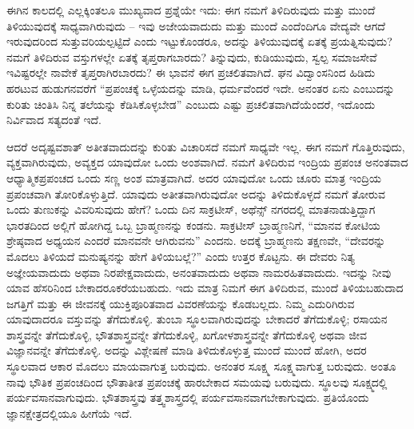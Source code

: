 ಈಗಿನ ಕಾಲದಲ್ಲಿ ಎಲ್ಲಕ್ಕಿಂತಲೂ ಮುಖ್ಯವಾದ ಪ್ರಶ್ನೆಯೇ ಇದು: ಈಗ ನಮಗೆ ತಿಳಿದಿರುವುದು ಮತ್ತು ಮುಂದೆ ತಿಳಿಯುವುದಕ್ಕೆ ಸಾಧ್ಯವಾಗಿರುವುದು – ಇವು ಅಜೇಯ\-ವಾದುದು ಮತ್ತು ಮುಂದೆ ಎಂದೆಂದಿಗೂ ವೇದ್ಯವೇ ಆಗದೆ ಇರುವುದರಿಂದ ಸುತ್ತುವರಿಯಲ್ಪಟ್ಟಿದೆ ಎಂದು ಇಟ್ಟುಕೊಂಡರೂ, ಅದನ್ನು ತಿಳಿಯುವುದಕ್ಕೆ ಏತಕ್ಕೆ ಪ್ರಯತ್ನಿಸುವುದು? ನಮಗೆ ತಿಳಿದಿರುವ ವಸ್ತುಗಳಲ್ಲೇ ಏತಕ್ಕೆ ತೃಪ್ತರಾಗಬಾರದು? ತಿನ್ನುವುದು, ಕುಡಿಯುವುದು, ಸ್ವಲ್ಪ ಸಮಾಜಸೇವೆ ಇವಿಷ್ಟರಲ್ಲೇ ನಾವೇಕೆ ತೃಪ್ತರಾಗಿರಬಾರದು? ಈ ಭಾವನೆ ಈಗ ಪ್ರಚಲಿತವಾಗಿದೆ. ಘನ ವಿದ್ವಾಂಸನಿಂದ ಹಿಡಿದು ಹರಟುವ ಹುಡುಗನವರೆಗೆ “ಪ್ರಪಂಚಕ್ಕೆ ಒಳ್ಳೆಯದನ್ನು ಮಾಡಿ, ಧರ್ಮವೆಂದರೆ ಇದೇ. ಅನಂತರ ಏನು ಎಂಬುದನ್ನು ಕುರಿತು ಚಿಂತಿಸಿ ನಿನ್ನ ತಲೆಯನ್ನು ಕೆಡಿಸಿಕೊಳ್ಳಬೇಡ” ಎಂಬುದು ಎಷ್ಟು ಪ್ರಚಲಿತವಾಗಿ\-ದೆಯೆಂದರೆ, ಇದೊಂದು ನಿರ್ವಿವಾದ ಸತ್ಯದಂತೆ ಇದೆ.

ಆದರೆ ಅದೃಷ್ಟವಶಾತ್ ಅತೀತವಾದುದನ್ನು ಕುರಿತು ವಿಚಾರಿಸದೆ ನಮಗೆ ಸಾಧ್ಯವೇ ಇಲ್ಲ. ಈಗ ನಮಗೆ ಗೊತ್ತಿರುವುದು, ವ್ಯಕ್ತವಾಗಿರುವುದು, ಅವ್ಯಕ್ತದ ಯಾವುದೋ ಒಂದು ಅಂಶವಾಗಿದೆ. ನಮಗೆ ತಿಳಿದಿರುವ ಇಂದ್ರಿಯ ಪ್ರಪಂಚ ಅನಂತವಾದ ಆಧ್ಯಾತ್ಮಿಕ\break ಪ್ರಪಂಚದ ಒಂದು ಸಣ್ಣ ಅಂಶ ಮಾತ್ರವಾಗಿದೆ. ಅದರ ಯಾವುದೋ ಒಂದು ಚೂರು ಮಾತ್ರ ಇಂದ್ರಿಯ ಪ್ರಪಂಚವಾಗಿ ತೋರಿಕೊಳ್ಳುತ್ತಿದೆ. ಯಾವುದು ಅತೀತವಾಗಿರುವುದೋ ಅದನ್ನು ತಿಳಿದುಕೊಳ್ಳದೆ ನಮಗೆ ತೋರುವ ಒಂದು ತುಣುಕನ್ನು ವಿವರಿಸುವುದು ಹೇಗೆ? ಒಂದು ದಿನ ಸಾಕ್ರಟೀಸ್, ಅಥೆನ್ಸ್ ನಗರದಲ್ಲಿ ಮಾತನಾಡುತ್ತಿದ್ದಾಗ ಭಾರತದಿಂದ ಅಲ್ಲಿಗೆ ಹೋಗಿದ್ದ ಒಬ್ಬ ಬ್ರಾಹ್ಮಣನನ್ನು ಕಂಡನು. ಸಾಕ್ರಟೀಸ್ ಬ್ರಾಹ್ಮಣನಿಗೆ, “ಮಾನವ ಕೋಟಿಯ ಶ್ರೇಷ್ಠವಾದ ಅಧ್ಯಯನ ಎಂದರೆ ಮಾನವನೇ ಆಗಿರುವನು” ಎಂದನು. ಅದಕ್ಕೆ ಬ್ರಾಹ್ಮಣನು ತಕ್ಷಣವೇ, “ದೇವರನ್ನು ಮೊದಲು ತಿಳಿಯದೆ ಮನುಷ್ಯನನ್ನು ಹೇಗೆ ತಿಳಿಯಬಲ್ಲೆ?'' ಎಂದು ಉತ್ತರ ಕೊಟ್ಟನು. ಈ ದೇವರು ನಿತ್ಯ ಅಜ್ಞೇಯವಾದುದು ಅಥವಾ ನಿರಪೇಕ್ಷವಾದುದು, ಅನಂತವಾದುದು ಅಥವಾ ನಾಮರಹಿತವಾದುದು. ಇದನ್ನು ನೀವು ಯಾವ ಹೆಸರಿನಿಂದ ಬೇಕಾದರೂಕರೆಯಬಹುದು. ಇದು ಮಾತ್ರ ನಿಮಗೆ ಈಗ ತಿಳಿದಿರುವ, ಮುಂದೆ ತಿಳಿಯಬಹುದಾದ ಜಗತ್ತಿಗೆ ಮತ್ತು ಈ ಜೀವನಕ್ಕೆ ಯುಕ್ತಿಪೂರಿತವಾದ ವಿವರಣೆಯನ್ನು ಕೊಡಬಲ್ಲದು. ನಿಮ್ಮ ಎದುರಿಗಿರುವ ಯಾವುದಾದರೂ ವಸ್ತುವನ್ನು ತೆಗೆದುಕೊಳ್ಳಿ. ತುಂಬಾ ಸ್ಥೂಲವಾಗಿರುವುದನ್ನು ಬೇಕಾದರೆ ತೆಗೆದುಕೊಳ್ಳಿ; ರಸಾಯನ ಶಾಸ್ತ್ರವನ್ನೇ ತೆಗೆದುಕೊಳ್ಳಿ, ಭೌತಶಾಸ್ತ್ರವನ್ನೇ ತೆಗೆದುಕೊಳ್ಳಿ, ಖಗೋಳಶಾಸ್ತ್ರವನ್ನೇ ತೆಗೆದುಕೊಳ್ಳಿ ಅಥವಾ ಜೀವ ವಿಜ್ಞಾನವನ್ನೇ ತೆಗೆದುಕೊಳ್ಳಿ. ಅದನ್ನು ವಿಶ್ಲೇಷಣೆ ಮಾಡಿ ತಿಳಿದುಕೊಳ್ಳುತ್ತ ಮುಂದೆ ಮುಂದೆ ಹೋಗಿ, ಅದರ ಸ್ಥೂಲವಾದ ಆಕಾರ ಮೊದಲು ಮಾಯವಾಗುತ್ತ ಬರುವುದು. ಅನಂತರ ಸೂಕ್ಷ್ಮ ಸೂಕ್ಷ್ಮವಾಗುತ್ತ ಬರುವುದು. ಅಂತೂ ನಾವು ಭೌತಿಕ ಪ್ರಪಂಚದಿಂದ ಭೌತಾತೀತ ಪ್ರಪಂಚಕ್ಕೆ ಹಾರಬೇಕಾದ ಸಮಯವು ಬರುವುದು. ಸ್ಥೂಲವು ಸೂಕ್ಷ್ಮದಲ್ಲಿ ಪರ್ಯವಸಾನವಾಗುವುದು. ಭೌತಶಾಸ್ತ್ರವು ತತ್ತ್ವಶಾಸ್ತ್ರದಲ್ಲಿ ಪರ್ಯವಸಾನವಾಗಬೇಕಾಗುವುದು. ಪ್ರತಿಯೊಂದು ಜ್ಞಾನಕ್ಷೇತ್ರದಲ್ಲಿಯೂ ಹೀಗೆಯೆ ಇದೆ.

